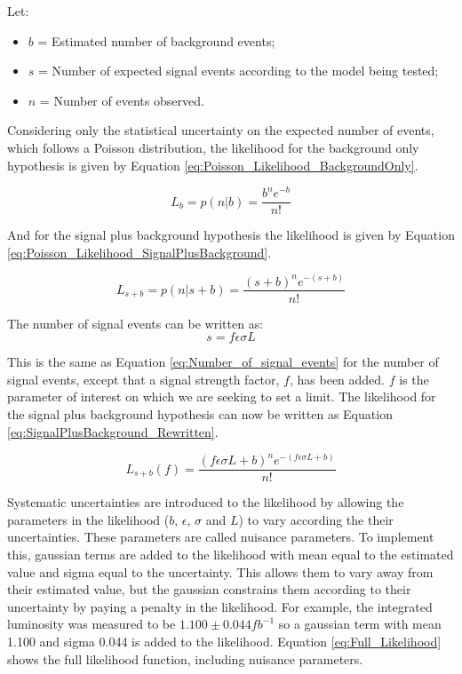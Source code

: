 Let: 
\begin{itemize}
\item $b$ = Estimated number of background events;
\item $s$ = Number of expected signal events according to the model being
tested;
\item $n$ = Number of events observed.
\end{itemize}

Considering only the statistical uncertainty on the expected number of events, 
which follows a Poisson distribution, the likelihood for the background only 
hypothesis is given by Equation \ref{eq:Poisson_Likelihood_BackgroundOnly}.

\begin{equation}
L_{b} = p(n|b) = \frac{b^{n}e^{-b}}{n!} 
\label{eq:Poisson_Likelihood_BackgroundOnly}
\end{equation}

And for the signal plus background hypothesis the likelihood is given by Equation
\ref{eq:Poisson_Likelihood_SignalPlusBackground}.

\begin{equation}
L_{s+b} = p(n|s+b) = \frac{(s+b)^{n}e^{-(s+b)}}{n!} 
\label{eq:Poisson_Likelihood_SignalPlusBackground}
\end{equation}

The number of signal events can be written as:
\begin{equation}
s = f\epsilon\sigma L
\label{eq:fsig}
\end{equation}

This is the same as Equation \ref{eq:Number_of_signal_events} for the number of 
signal events, except that a signal strength factor, $f$, has been added. $f$ is 
the parameter of interest on which we are seeking to set a limit. The likelihood 
for the signal plus background hypothesis can now be written as Equation 
\ref{eq:SignalPlusBackground_Rewritten}. 

\begin{equation}
L_{s+b}(f) = \frac{(f\epsilon \sigma L + b)^{n} e^{-(f\epsilon \sigma L + b)}}{n!} 
\label{eq:SignalPlusBackground_Rewritten}
\end{equation}

Systematic uncertainties are introduced to the likelihood by allowing the 
parameters in the likelihood ($b$, $\epsilon$, $\sigma$ and $L$) to vary 
according the their uncertainties. These parameters are called nuisance 
parameters. To implement this, gaussian terms are added to the likelihood with 
mean equal to the estimated value and sigma equal to the uncertainty. This 
allows them to vary away from their estimated value, but the gaussian constrains 
them according to their uncertainty by paying a penalty in the likelihood. For 
example, the integrated luminosity was measured to be $1.100\pm0.044 
\unit{fb^{-1}}$ so a gaussian term with mean 1.100 and sigma 0.044 is added to 
the likelihood. Equation \ref{eq:Full_Likelihood} shows the full likelihood 
function, including nuisance parameters. 

